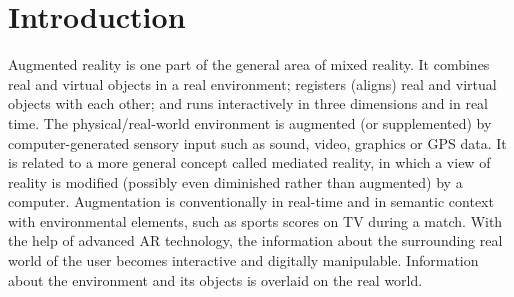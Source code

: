 \documentclass[preprint,12pt]{elsarticle}
\begin{document}

\section{Introduction}


Augmented reality is one part of the general area of mixed reality\cite{mistry2009sixthsense}. It combines real and virtual objects in a real environment; registers (aligns) real and virtual objects with each other; and runs interactively in three dimensions and in real time. The physical/real-world environment is augmented (or supplemented) by computer-generated sensory input such as sound, video, graphics or GPS data\cite{jebara1997stochasticks}. It is related to a more general concept called mediated reality, in which a view of reality is modified (possibly even diminished rather than augmented) by a computer. Augmentation is conventionally in real-time and in semantic context with environmental elements, such as sports scores on TV during a match. With the help of advanced AR technology, the information about the surrounding real world of the user becomes interactive and digitally manipulable. Information about the environment and its objects is overlaid on the real world.


\end{document}

